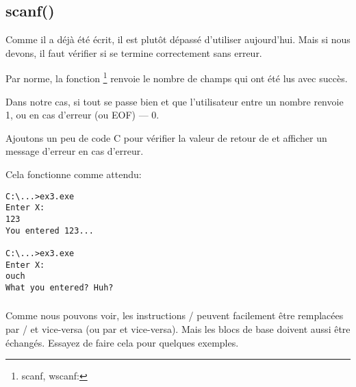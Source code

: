 \subsection{scanf()}

Comme il a déjà été écrit, il est plutôt dépassé d'utiliser \scanf aujourd'hui.
Mais si nous devons, il faut vérifier si \scanf se termine correctement sans erreur.



Par norme, la fonction \scanf\footnote{scanf, wscanf: \MSDNscanf{}}
renvoie le nombre de champs qui ont été lus avec succès.

Dans notre cas, si tout se passe bien et que l'utilisateur entre un nombre \scanf
renvoie 1, ou en cas d'erreur (ou \ac{EOF}) --- 0.

Ajoutons un peu de code C pour vérifier la valeur de retour de \scanf et afficher
un message d'erreur en cas d'erreur.

Cela fonctionne comme attendu:

\begin{lstlisting}
C:\...>ex3.exe
Enter X:
123
You entered 123...

C:\...>ex3.exe
Enter X:
ouch
What you entered? Huh?
\end{lstlisting}






\subsubsection{\Exercise}

Comme nous pouvons voir, les instructions / peuvent facilement
être remplacées par / et vice-versa (ou  par  et vice-versa).
Mais les blocs de base doivent aussi être échangés.
Essayez de faire cela pour quelques exemples.

